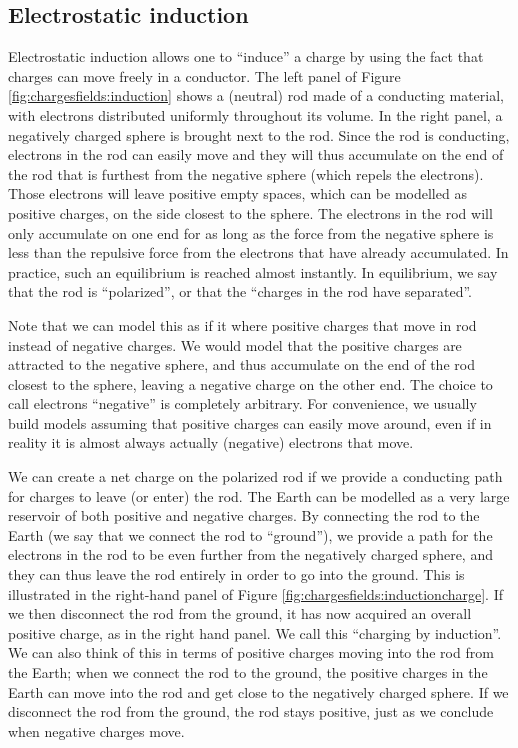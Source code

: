 \subsection{Electrostatic induction}
Electrostatic induction allows one to ``induce'' a charge by using the fact that charges can move freely in a conductor. The left panel of Figure \ref{fig:chargesfields:induction} shows a (neutral) rod made of a conducting material, with electrons distributed uniformly throughout its volume. In the right panel, a negatively charged sphere is brought next to the rod. Since the rod is conducting, electrons in the rod can easily move and they will thus accumulate on the end of the rod that is furthest from the negative sphere (which repels the electrons). Those electrons will leave positive empty spaces, which can be modelled as positive charges, on the side closest to the sphere. The electrons in the rod will only accumulate on one end for as long as the force from the negative sphere is less than the repulsive force from the electrons that have already accumulated. In practice, such an equilibrium is reached almost instantly. In equilibrium, we say that the rod is ``polarized'', or that the ``charges in the rod have separated''.

Note that we can model this as if it where positive charges that move in rod instead of negative charges. We would model that the positive charges are attracted to the negative sphere, and thus accumulate on the end of the rod closest to the sphere, leaving a negative charge on the other end. The choice to call electrons ``negative'' is completely arbitrary. For convenience, we usually build models assuming that positive charges can easily move around, even if in reality it is almost always actually (negative) electrons that move.


We can create a net charge on the polarized rod if we provide a conducting path for charges to leave (or enter) the rod. The Earth can be modelled as a very large reservoir of both positive and negative charges. By connecting the rod to the Earth (we say that we connect the rod to ``ground''), we provide a path for the electrons in the rod to be even further from the negatively charged sphere, and they can thus leave the rod entirely in order to go into the ground. This is illustrated in the right-hand panel of Figure \ref{fig:chargesfields:inductioncharge}. If we then disconnect the rod from the ground, it has now acquired an overall positive charge, as in the right hand panel. We call this ``charging by induction''. We can also think of this in terms of positive charges moving into the rod from the Earth; when we connect the rod to the ground, the positive charges in the Earth can move into the rod and get close to the negatively charged sphere. If we disconnect the rod from the ground, the rod stays positive, just as we conclude when negative charges move.


